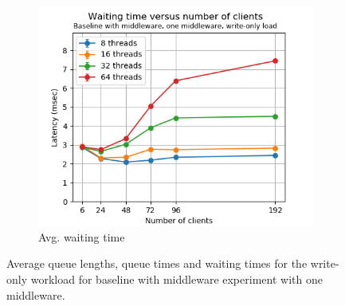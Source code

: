 \documentclass[11pt,a4paper]{article}
\begin{document}
\begin{figure}[h]
\begin{subfigure}{.33\textwidth}
\end{subfigure}%
\begin{subfigure}{.33\textwidth}
  \centering
  \includegraphics[width=1.0\linewidth,trim={0px 0px 0px 0px},clip]{img/plot/mwb1-wo-wtime-mini.png}
  \caption{Avg. waiting time}
  \label{fig:mwb1-wo-wtime-mini}
\end{subfigure}
\caption{Average queue lengths, queue times and waiting times for the write-only workload for baseline with middleware experiment with one middleware.}
\label{fig:mwb1-wo-mini}
\end{figure}
\end{document}
